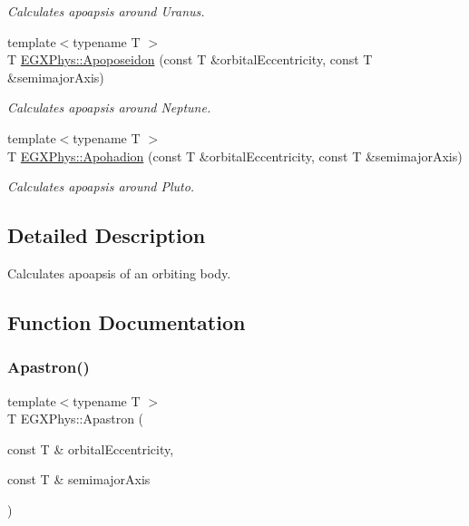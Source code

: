\begin{DoxyCompactItemize}
\begin{DoxyCompactList}\small\item\em Calculates apoapsis around Uranus. \end{DoxyCompactList}\item 
{\footnotesize template$<$typename T $>$ }\\T \mbox{\hyperlink{group___apoapsis_ga89679654fff13176e989536163a27f9d}{E\+G\+X\+Phys\+::\+Apoposeidon}} (const T \&orbital\+Eccentricity, const T \&semimajor\+Axis)
\begin{DoxyCompactList}\small\item\em Calculates apoapsis around Neptune. \end{DoxyCompactList}\item 
{\footnotesize template$<$typename T $>$ }\\T \mbox{\hyperlink{group___apoapsis_gaa16847ddc5763c327067075dcb6a3353}{E\+G\+X\+Phys\+::\+Apohadion}} (const T \&orbital\+Eccentricity, const T \&semimajor\+Axis)
\begin{DoxyCompactList}\small\item\em Calculates apoapsis around Pluto. \end{DoxyCompactList}\end{DoxyCompactItemize}


\subsection{Detailed Description}
Calculates apoapsis of an orbiting body. 

\subsection{Function Documentation}
\mbox{\label{group___apoapsis_ga2fc1c406ce10f59b4f325150aecd279a}} 
\subsubsection{\texorpdfstring{Apastron()}{Apastron()}}
{\footnotesize\ttfamily template$<$typename T $>$ \\
T E\+G\+X\+Phys\+::\+Apastron (\begin{DoxyParamCaption}\item[{const T \&}]{orbital\+Eccentricity,  }\item[{const T \&}]{semimajor\+Axis }\end{DoxyParamCaption})}



